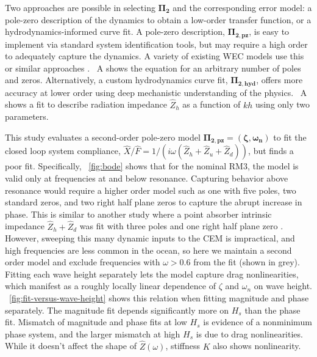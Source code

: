 \documentclass[10pt,twoside]{article}
\begin{document}
Two approaches are possible in selecting $\mathbf{\Pi_2}$ and the corresponding error model: a pole-zero description of the dynamics to obtain a low-order transfer function, or a hydrodynamics-informed curve fit.
A pole-zero description, $\mathbf{\Pi_{2,pz}}$, is easy to implement via standard system identification tools, but may require a high order to adequately capture the dynamics. 
A variety of existing WEC models use this \cite{bacelli_system_2017} or similar approaches \cite{kristiansen_state-space_2005}. 
\appendixname~A shows the equation for an arbitrary number of poles and zeros.
Alternatively, a custom hydrodynamics curve fit, $\mathbf{\Pi_{2,hyd}}$, offers more accuracy at lower order using deep mechanistic understanding of the physics. \appendixname~A shows a fit to describe radiation impedance $\hat{Z}_h$ as a function of $kh$ using only two parameters.

This study evaluates a second-order pole-zero model $\mathbf{\Pi_{2,pz}=(\zeta,\omega_n)}$ to fit the closed loop system compliance, $\hat{X}/\hat{F}=1/(i\omega(\hat{Z}_h+\hat{Z}_u+\hat{Z}_d))$,  but finds a poor fit.
Specifically, \figureautorefname~\ref{fig:bode} shows that for the nominal RM3, the model is valid only at frequencies at and below resonance.
Capturing behavior above resonance would require a higher order model such as one with five poles, two standard zeros, and two right half plane zeros to capture the abrupt increase in phase.
This is similar to another study where a point absorber intrinsic impedance $\hat{Z}_h + \hat{Z}_d$ was fit with three poles and one right half plane zero \cite{bacelli_system_2017}.
However, sweeping this many dynamic inputs to the CEM is impractical, and high frequencies are less common in the ocean, so here we maintain a second order model and exclude frequencies with $\omega>0.6$ from the fit (shown in grey).
Fitting each wave height separately lets the model capture drag nonlinearities, which manifest as a roughly locally linear dependence of $\zeta$ and $\omega_n$ on wave height.
\figureautorefname~\ref{fig:fit-versus-wave-height} shows this relation when fitting magnitude and phase separately.
The magnitude fit depends significantly more on $H_s$ than the phase fit.
Mismatch of magnitude and phase fits at low $H_s$ is evidence of a nonminimum phase system, and the larger mismatch at high $H_s$ is due to drag nonlinearities.
While it doesn't affect the shape of $\hat{Z}(\omega)$, stiffness $K$ also shows nonlinearity.
\end{document}
